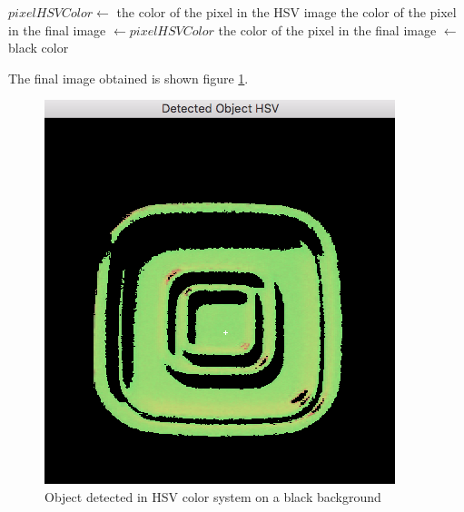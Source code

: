 \begin{algorithmic}
    			\State $pixelHSVColor \gets$ the color of the pixel in the HSV image
    			\State the color of the pixel in the final image $\gets pixelHSVColor$
		\Else
        			\State the color of the pixel in the final image $\gets$ black color
		\EndIf
	\EndFor
\EndFunction
\end{algorithmic}

The final image obtained is shown figure \ref{fig:finalImage}.

\begin{figure}[h]
  \centering
  \includegraphics[scale=0.6]{fig/finalImage.png}
  \caption{Object detected in HSV color system on a black background}
  \label{fig:finalImage}
\end{figure}